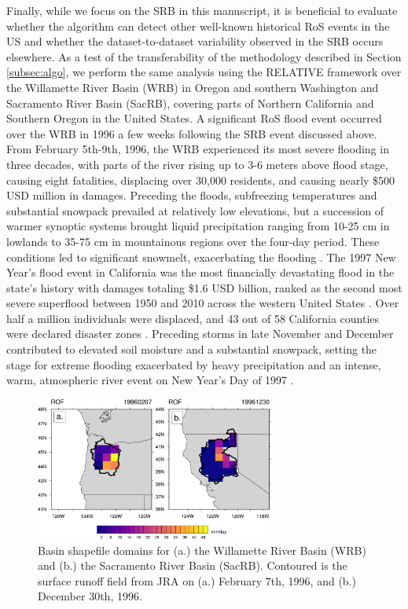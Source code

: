 \documentclass[nhess, manuscript]{copernicus}
\begin{document}
Finally, while we focus on the SRB in this manuscript, it is beneficial to evaluate whether the algorithm can detect other well-known historical RoS events in the US and whether the dataset-to-dataset variability observed in the SRB occurs elsewhere.
As a test of the transferability of the methodology described in Section \ref{subsec:algo}, we perform the same analysis using the RELATIVE framework over the Willamette River Basin (WRB) in Oregon and southern Washington and Sacramento River Basin (SacRB), covering parts of Northern California and Southern Oregon in the United States.
A significant RoS flood event occurred over the WRB in 1996 a few weeks following the SRB event discussed above.
From February 5th-9th, 1996, the WRB experienced its most severe flooding in three decades, with parts of the river rising up to 3-6 meters above flood stage, causing eight fatalities, displacing over 30,000 residents, and causing nearly \$500 USD million in damages.
Preceding the floods, subfreezing temperatures and substantial snowpack prevailed at relatively low elevations, but a succession of warmer synoptic systems brought liquid precipitation ranging from 10-25 cm in lowlands to 35-75 cm in mountainous regions over the four-day period.
These conditions led to significant snowmelt, exacerbating the flooding \citep{halpert1997climate,colle2000february}.
The 1997 New Year's flood event in California was the most financially devastating flood in the state's history with damages totaling \$1.6 USD billion, ranked as the second most severe superflood between 1950 and 2010 across the western United States \citep{tarouilly2021western}.
Over half a million individuals were displaced, and 43 out of 58 California counties were declared disaster zones \citep{lott1997}.
Preceding storms in late November and December contributed to elevated soil moisture and a substantial snowpack, setting the stage for extreme flooding exacerbated by heavy precipitation and an intense, warm, atmospheric river event on New Year's Day of 1997 \citep{galewsky2005moist,rhoades2023recreating}.

\begin{figure}
\noindent\includegraphics[width=0.7\textwidth]{figs/cropped/other_basins_ROF.pdf}
\caption{Basin shapefile domains for (a.) the Willamette River Basin (WRB) and (b.) the Sacramento River Basin (SacRB). Contoured is the surface runoff field from JRA on (a.) February 7th, 1996, and (b.) December 30th, 1996.}
\label{fig:otherbasins}
\end{figure}
\end{document}

